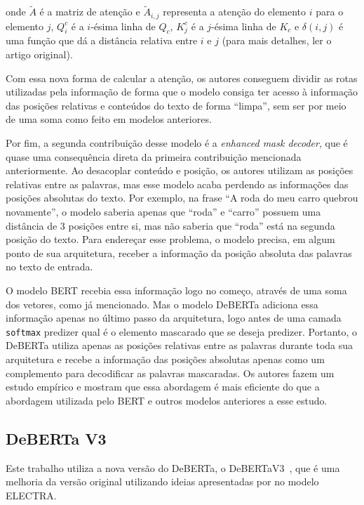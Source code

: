 onde $\tilde{A}$ é a matriz de atenção e $\tilde{A}_{i,j}$ representa a atenção
do elemento $i$ para o elemento $j$, $Q^{c}_i$ é a $i$-ésima linha de $Q_c$,
$K^{c}_j$ é a $j$-ésima linha de $K_c$ e $\delta(i,j)$ é uma função que dá a
distância relativa entre $i$ e $j$ (para mais detalhes, ler o artigo original).

Com essa nova forma de calcular a atenção, os autores conseguem dividir as rotas
utilizadas pela informação de forma que o modelo consiga ter acesso à informação
das posições relativas e conteúdos do texto de forma ``limpa'', sem ser por meio
de uma soma como feito em modelos anteriores.

Por fim, a segunda contribuição desse modelo é a \textit{enhanced mask decoder},
que é quase uma consequência direta da primeira contribuição mencionada
anteriormente. Ao desacoplar conteúdo e posição, os autores utilizam as posições
relativas entre as palavras, mas esse modelo acaba perdendo as informações das
posições absolutas do texto. Por exemplo, na frase ``A roda do meu carro quebrou
novamente'', o modelo saberia apenas que ``roda'' e ``carro'' possuem uma
distância de 3 posições entre si, mas não saberia que ``roda'' está na segunda
posição do texto. Para endereçar esse problema, o modelo precisa, em algum ponto
de sua arquitetura, receber a informação da posição absoluta das palavras no
texto de entrada.

O modelo BERT recebia essa informação logo no começo, através de uma soma dos
vetores, como já mencionado. Mas o modelo DeBERTa adiciona essa informação
apenas no último passo da arquitetura, logo antes de uma camada
\texttt{softmax} predizer qual é o elemento mascarado que se deseja predizer.
Portanto, o DeBERTa utiliza apenas as posições relativas entre as palavras
durante toda sua arquitetura e recebe a informação das posições absolutas apenas
como um complemento para decodificar as palavras mascaradas. Os autores fazem um
estudo empírico e mostram que essa abordagem é mais eficiente do que a abordagem
utilizada pelo BERT e outros modelos anteriores a esse estudo.

\subsection{DeBERTa V3}%
\label{sub:deberta_v3}

Este trabalho utiliza a nova versão do DeBERTa, o
DeBERTaV3~\cite{he-etal:2021:debertav3}, que é uma melhoria da versão original
utilizando ideias apresentadas por \cite{clark-etal:2020:electra} no modelo
ELECTRA.

